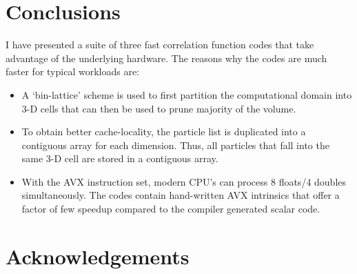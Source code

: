 \documentclass[preprint, 12pt, authoryear]{elsarticle}
\begin{document}
\section{Conclusions}
I have presented a suite of three fast correlation function codes that take advantage of the underlying hardware. The reasons why the codes 
are much faster for typical workloads are:
\begin{itemize}
\item A `bin-lattice' scheme is used to first partition the computational domain into 3-D cells that can then be used to prune majority of the volume. 
\item To obtain better cache-locality, the particle list is duplicated into a contiguous array for each dimension. Thus, all particles that fall into the
same 3-D cell are stored in a contiguous array. 
\item With the AVX instruction set, modern CPU's can process 8 floats/4 doubles simultaneously. The codes contain hand-written AVX intrinsics that offer a 
factor of few speedup compared to the compiler generated scalar code. 
\end{itemize}
\citet{foreman-mackey_etal_13}

\section*{Acknowledgements}



\end{document}
